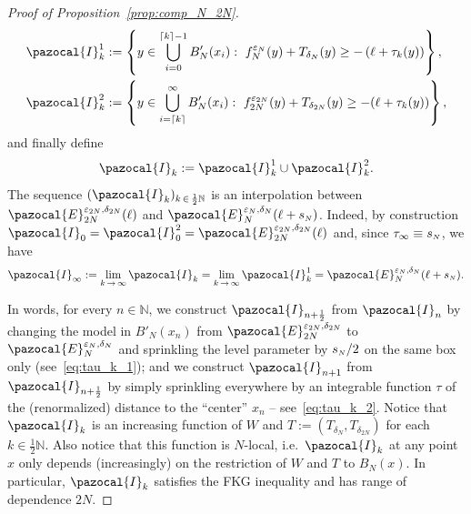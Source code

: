 \documentclass[10pt]{amsart}
\theoremstyle{definition}\newtheorem{defi}[theo]{Definition}\newtheorem{rema}[theo]{Remark}\newtheorem{exam}[theo]{Example}\newtheorem{exem}[theo]{Example}\newtheorem{nota}[theo]{Notation}
\newcommand{\N}{\mathbb{N}}
\newcommand{\si}[1]{{\mathchoice{}{}{\scriptscriptstyle}{}#1}}
\newcommand{\sN}{{\mathchoice{}{}{\scriptscriptstyle}{}N}}
\begin{document}
\begin{proof}[Proof of Proposition~\ref{prop:comp_N_2N}]
\begin{align}
\pazocal{I}^1_k &:= \left\{y\in\bigcup_{i=0}^{\lceil k\rceil-1} B'_N(x_i):~f_N^{\varepsilon_{N}}(y)+T_{\delta_{N}}(y)\geq -\left(\ell+\tau_k(y)\right)\right\},\label{eq:I_1}\\
\pazocal{I}^2_k &:=\left\{y\in\bigcup_{i=\lceil k\rceil}^{\infty} B'_N(x_i):~f_{2N}^{\varepsilon_{2N}}(y)+T_{\delta_{2N}}(y)\geq -(\ell+\tau_k(y))\right\},\label{eq:I_2}
\end{align}
and finally define
\begin{equation}\label{eq:I}
\pazocal{I}_k := \pazocal{I}^1_k\cup \pazocal{I}^2_k.
\end{equation}
The sequence $(\pazocal{I}_k)_{k\,\in\,\frac12 \N}$ is an interpolation between $\pazocal{E}_{2N}^{\varepsilon_{\si{2N}},\delta_{\si{2N}}}(\ell)$ and $\pazocal{E}_{N}^{\varepsilon_{\sN}, \delta_{\sN}}(\ell+s_{\sN})$. Indeed, by construction $\pazocal{I}_0=\pazocal{I}_0^2=\pazocal{E}_{2N}^{\varepsilon_{\si{2N}},\delta_{\si{2N}}}(\ell)$ and, since $\tau_{\infty}\equiv s_{\sN}$, we have
\begin{equation}
\pazocal{I}_\infty:=\lim_{k\,\to\,\infty} \pazocal{I}_k = \lim_{k\,\to\,\infty} \pazocal{I}_k^1 = \pazocal{E}_{N}^{\varepsilon_{\sN}, \delta_{\sN}}(\ell+s_{\sN}).
\end{equation}

In words, for every $n\in\N$, we construct $\pazocal{I}_{n+\frac12}$ from $\pazocal{I}_n$ by changing the model in $B'_N(x_n)$ from $\pazocal{E}_{2N}^{\varepsilon_{\si{2N}}, \delta_{\si{2N}}}$ to $\pazocal{E}_{N}^{\varepsilon_{\sN}, \delta_{\sN}}$ and sprinkling the level parameter by $s_{\sN}/2$ on the same box only (see~\eqref{eq:tau_k_1}); and we construct $\pazocal{I}_{n+1}$ from $\pazocal{I}_{n+\frac12}$ by simply sprinkling everywhere by an integrable function $\tau$ of the (renormalized) distance to the ``center'' $x_n$ -- see~\eqref{eq:tau_k_2}. Notice that $\pazocal{I}_k$ is an increasing function of $W$ and $T:=(T_{\delta_N},T_{\delta_{2N}})$ for each $k\in\tfrac12\N$. Also notice that this function is $N$-local, i.e.~$\pazocal{I}_k$ at any point $x$ only depends (increasingly) on the restriction of $W$ and $T$ to $B_N(x)$. In particular, $\pazocal{I}_k$ satisfies the FKG inequality and has range of dependence $2N$.


\end{proof}
\end{document}

